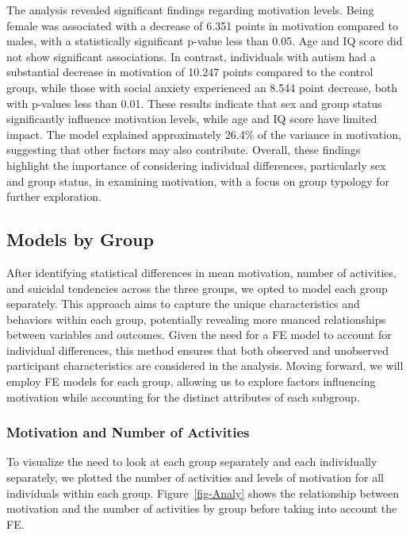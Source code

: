 \documentclass[
  letterpaper,
  number,
  review,
  3p]{elsarticle}
\begin{document}
The analysis revealed significant findings regarding motivation levels.
Being female was associated with a decrease of 6.351 points in
motivation compared to males, with a statistically significant p-value
less than 0.05. Age and IQ score did not show significant associations.
In contrast, individuals with autism had a substantial decrease in
motivation of 10.247 points compared to the control group, while those
with social anxiety experienced an 8.544 point decrease, both with
p-values less than 0.01. These results indicate that sex and group
status significantly influence motivation levels, while age and IQ score
have limited impact. The model explained approximately 26.4\% of the
variance in motivation, suggesting that other factors may also
contribute. Overall, these findings highlight the importance of
considering individual differences, particularly sex and group status,
in examining motivation, with a focus on group typology for further
exploration.

\subsection{Models by Group}\label{models-by-group}

After identifying statistical differences in mean motivation, number of
activities, and suicidal tendencies across the three groups, we opted to
model each group separately. This approach aims to capture the unique
characteristics and behaviors within each group, potentially revealing
more nuanced relationships between variables and outcomes. Given the
need for a FE model to account for individual differences, this method
ensures that both observed and unobserved participant characteristics
are considered in the analysis. Moving forward, we will employ FE models
for each group, allowing us to explore factors influencing motivation
while accounting for the distinct attributes of each subgroup.

\subsubsection{Motivation and Number of
Activities}\label{motivation-and-number-of-activities}

To visualize the need to look at each group separately and each
individually separately, we plotted the number of activities and levels
of motivation for all individuals within each group.
Figure~\ref{fig-Analy} shows the relationship between motivation and the
number of activities by group before taking into account the FE.
\end{document}

